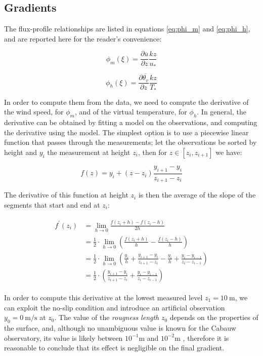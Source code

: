 \documentclass[12pt]{book}
\begin{document}
\subsection{Gradients}
\label{sec:gradients}
The flux-profile relationships are listed in equations \ref{eq:phi_m} and \ref{eq:phi_h}, and are reported here for the reader's convenience:

$$
\phi_m(\xi)=\frac{\partial\overline{u}}{\partial z}\frac{kz}{u_*}
$$

$$
\phi_h(\xi)=\frac{\partial\overline{\theta_v}}{\partial z}\frac{kz}{T_*}
$$

In order to compute them from the data, we need to compute the derivative of the wind speed, for $\phi_m$, and of the virtual temperature, for $\phi_h$. In general, the derivative can be obtained by fitting a model on the observations, and computing the derivative using the model. The simplest option is to use a piecewise linear function that passes through the measurements; let the observations be sorted by height and $y_i$ the measurement at height $z_i$, then for $z\in[z_i,z_{i+1}]$ we have:

\begin{equation}
f(z)=y_i+(z-z_i)\frac{y_{i+1}-y_i}{z_{i+1}-z_i}
\end{equation}

The derivative of this function at height $z_i$ is then the average of the slope of the segments that start and end at $z_i$:

\begin{align}
\label{eq:fd_gradient}
\begin{split}
f^\prime(z_i)&=\lim_{h\rightarrow 0}\frac{f(z_i+h)-f(z_i-h)}{2h} \\
&=\frac{1}{2}\cdot\lim_{h\rightarrow 0}\left(\frac{f(z_i+h)}{h}-\frac{f(z_i-h)}{h}\right) \\
&=\frac{1}{2}\cdot\lim_{h\rightarrow 0}\left(
\frac{y_i}{h}+\frac{y_{i+1}-y_i}{z_{i+1}-z_i}-\frac{y_i}{h}+\frac{y_i-y_{i-1}}{z_i-z_{i-1}}
\right)\\
&=\frac{1}{2}\cdot\left(
\frac{y_{i+1}-y_i}{z_{i+1}-z_i}+\frac{y_i-y_{i-1}}{z_i-z_{i-1}}
\right)
\end{split}
\end{align}

In order to compute this derivative at the lowest measured level $z_1=\SI{10}{\meter}$, we can exploit the no-slip condition and introduce an artificial observation $y_0=\SI{0}{\meter\per\second}$ at $z_0$. The value of the \emph{rougness length} $z_0$ depends on the properties of the surface, and, although no unambiguous value is known for the Cabauw observatory, its value is likely between $10^{-1}$m and $10^{-2}$m \citep{cabauw_z0, cabauw_night}, therefore it is reasonable to conclude that its effect is negligible on the final gradient.
\end{document}
